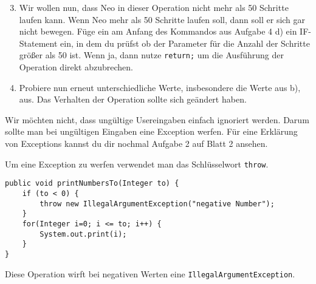 \begin{enumerate}\setcounter{enumi}{2}
	\item
		Wir wollen nun, dass Neo in dieser Operation nicht mehr als 50 Schritte laufen kann. 
		Wenn Neo mehr als 50 Schritte laufen soll, dann soll er sich gar nicht bewegen.
		Füge ein am Anfang des Kommandos aus Aufgabe 4 d) ein IF-Statement ein, in dem du prüfst ob der Parameter für die Anzahl der Schritte größer als 50 ist.
		Wenn ja, dann nutze \lstinline{return;} um die Ausführung der Operation direkt abzubrechen.

	\item
		Probiere nun erneut unterschiedliche Werte, insbesondere die Werte aus b), aus.
		Das Verhalten der Operation sollte sich geändert haben.
\end{enumerate}

\medskip %

\begin{Infobox}
	Wir möchten nicht, dass ungültige Usereingaben einfach ignoriert werden. 
	Darum sollte man bei ungültigen Eingaben eine Exception werfen.
	Für eine Erklärung von Exceptions kannst du dir nochmal Aufgabe 2 auf Blatt 2 ansehen.

	Um eine Exception zu werfen verwendet man das Schlüsselwort \lstinline{throw}.

	\begin{lstlisting}[xleftmargin=0.5cm]
public void printNumbersTo(Integer to) {
    if (to < 0) {
        throw new IllegalArgumentException("negative Number");	
    }
    for(Integer i=0; i <= to; i++) {
        System.out.print(i);
    }
}
	\end{lstlisting}
	
	Diese Operation wirft bei negativen Werten eine \lstinline{IllegalArgumentException}.
\end{Infobox}


